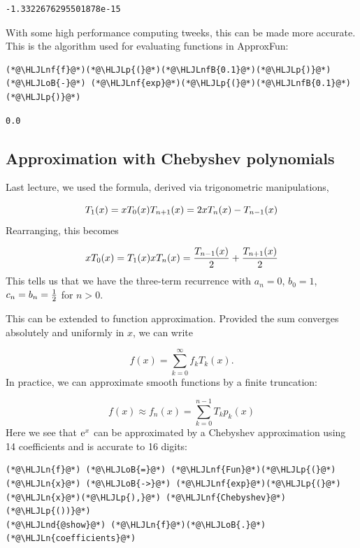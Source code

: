 \documentclass[12pt,a4paper]{article}
\newcommand{\HLJLn}[1]{#1}
\newcommand{\HLJLnd}[1]{\textcolor[RGB]{214,102,97}{#1}}
\newcommand{\HLJLnf}[1]{\textcolor[RGB]{66,102,213}{#1}}
\newcommand{\HLJLnfB}[1]{\textcolor[RGB]{59,151,46}{#1}}
\newcommand{\HLJLoB}[1]{\textcolor[RGB]{102,102,102}{\textbf{#1}}}
\newcommand{\HLJLp}[1]{#1}
\def\E{ {\rm e} }
\begin{document}
\begin{lstlisting}
-1.3322676295501878e-15
\end{lstlisting}


With some high performance computing tweeks, this can be made more accurate. This is the algorithm used for evaluating functions in ApproxFun:


\begin{lstlisting}
(*@\HLJLnf{f}@*)(*@\HLJLp{(}@*)(*@\HLJLnfB{0.1}@*)(*@\HLJLp{)}@*) (*@\HLJLoB{-}@*) (*@\HLJLnf{exp}@*)(*@\HLJLp{(}@*)(*@\HLJLnfB{0.1}@*)(*@\HLJLp{)}@*)
\end{lstlisting}

\begin{lstlisting}
0.0
\end{lstlisting}


\subsection{Approximation with Chebyshev polynomials}
Last lecture, we used the formula, derived via trigonometric manipulations, 

\[
T_1(x) = x T_0(x) \\
T_{n+1}(x) = 2x T_n(x) - T_{n-1}(x)
\]
Rearranging, this becomes

\[
 x T_0(x) = T_1(x) \\
x T_n(x)  =  {T_{n-1}(x) \over 2} + {T_{n+1}(x) \over 2}
\]
This tells us that we have the three-term recurrence with $a_n = 0$, $b_0 = 1$, $c_n = b_n = {1 \over 2}$ for $n > 0$.

This can be extended to function approximation. Provided the sum converges absolutely and uniformly in $x$, we can write

\[
f(x) = \sum_{k=0}^\infty f_k T_k(x).
\]
In practice, we can approximate smooth functions by a finite truncation:

\[
f(x) \approx f_n(x) = \sum_{k=0}^{n-1} T_k p_k(x)
\]
Here we see that $\E^x$ can be approximated by a Chebyshev approximation using 14 coefficients and is accurate to 16 digits:


\begin{lstlisting}
(*@\HLJLn{f}@*) (*@\HLJLoB{=}@*) (*@\HLJLnf{Fun}@*)(*@\HLJLp{(}@*)(*@\HLJLn{x}@*) (*@\HLJLoB{->}@*) (*@\HLJLnf{exp}@*)(*@\HLJLp{(}@*)(*@\HLJLn{x}@*)(*@\HLJLp{),}@*) (*@\HLJLnf{Chebyshev}@*)(*@\HLJLp{())}@*)
(*@\HLJLnd{@show}@*) (*@\HLJLn{f}@*)(*@\HLJLoB{.}@*)(*@\HLJLn{coefficients}@*)
\end{lstlisting}
\end{document}

